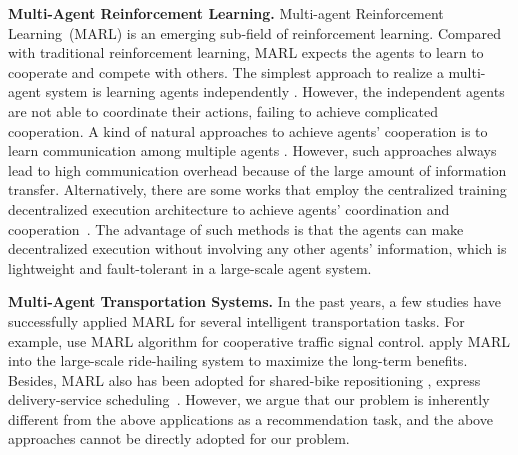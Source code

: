 \documentclass[sigconf]{acmart}
\newcommand{\jia}[1]{{\color{black}{#1}}}
\newcommand{\eg}{\emph{e.g.},\xspace}
\begin{document}
\noindent \textbf{Multi-Agent Reinforcement Learning.}
Multi-agent Reinforcement Learning~(MARL) is an emerging sub-field of reinforcement learning. Compared with traditional reinforcement learning, MARL expects the agents to learn to cooperate and compete with others. The simplest approach to realize a multi-agent system is learning agents independently \cite{tan1993multi,tampuu2017multiagent,gupta2017cooperative}. However, the independent agents are not able to coordinate their actions, failing to achieve complicated cooperation\cite{sukhbaatar2016learning,DBLP:journals/ker/MatignonLF12,lowe2017multi}.
A kind of natural approaches to achieve agents' cooperation is to learn communication among multiple agents \cite{foerster2016learning,sukhbaatar2016learning,peng2017multiagent,jiang2018learning}. 
However, such approaches always lead to high communication overhead because of the large amount of information transfer.
Alternatively, there are some works that employ the centralized training decentralized execution architecture to achieve agents' coordination and cooperation~\cite{lowe2017multi,DBLP:conf/aaai/FoersterFANW18,iqbal2019actor}. 
The advantage of such methods is that the agents can make decentralized execution without involving any other agents' information, which is lightweight and fault-tolerant in a large-scale agent system.


\noindent\textbf{Multi-Agent Transportation Systems.}
In the past years, a few studies have successfully applied MARL for several intelligent transportation tasks. For example, \cite{wei2019colight,wang2020stmarl} use MARL algorithm for cooperative traffic signal control. \cite{li2019efficient,lin2018efficient,jin2019coride,zhou2019multi} apply MARL into the large-scale ride-hailing system to maximize the long-term benefits. Besides, MARL also has been adopted for shared-bike repositioning \cite{li2018dynamic}, express delivery-service scheduling~\cite{liyexin2019efficient}.
However, we argue that our problem is inherently different from the above applications as a recommendation task, and the above approaches cannot be directly adopted for our problem.
\end{document}
